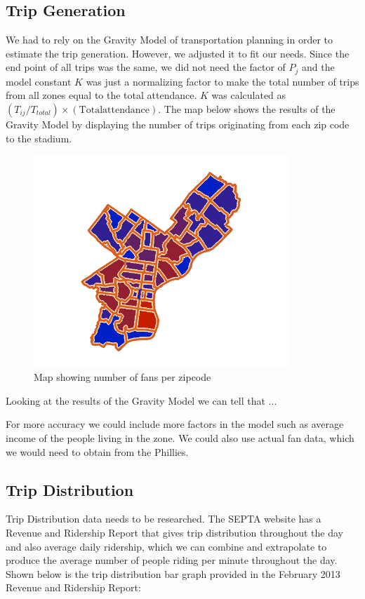 
\subsection{Trip Generation}

We had to rely on the Gravity Model of transportation planning in
order to estimate the trip generation. However, we adjusted it to fit
our needs. Since the end point of all trips was the same, we did not
need the factor of $P_j$ and the model constant $K$ was just a
normalizing factor to make the total number of trips from all zones
equal to the total attendance. $K$ was calculated as
$(T_{ij}/T_{total}) \times (\mathrm{Total attendance})$. The map below
shows the results of the Gravity Model by displaying the number of
trips originating from each zip code to the stadium.

\begin{figure}[htp]
  \centering
  \includegraphics[height=8cm]{graphics/trip-generation.png}
  \caption{Map showing number of fans per zipcode}
  \label{fig-trip-generation-results}
\end{figure}

Looking at the results of the Gravity Model we can tell that ...

For more accuracy we could include more factors in the model such as
average income of the people living in the zone. We could also use
actual fan data, which we would need to obtain from the Phillies.


\subsection{Trip Distribution}

Trip Distribution data needs to be researched. The SEPTA website has a
Revenue and Ridership Report that gives trip distribution throughout
the day and also average daily ridership, which we can combine and
extrapolate to produce the average number of people riding per minute
throughout the day. Shown below is the trip distribution bar graph
provided in the February 2013 Revenue and Ridership Report:

